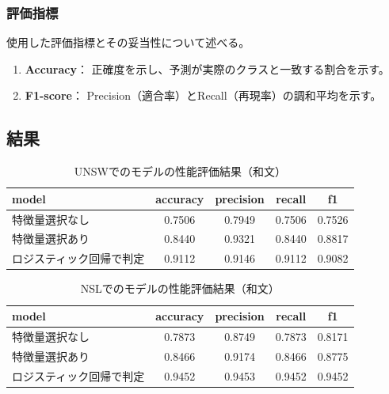 \documentclass{css}
\begin{document}
\subsubsection{評価指標}
使用した評価指標とその妥当性について述べる。
\begin{enumerate}
    \item \textbf{Accuracy}：
        正確度を示し、予測が実際のクラスと一致する割合を示す。
    \item \textbf{F1-score}：
        Precision（適合率）とRecall（再現率）の調和平均を示す。
\end{enumerate}

\subsection{結果}

\begin{table}[tb]
    \caption{UNSWでのモデルの性能評価結果（和文）}
    \centering
    \footnotesize
    \begin{tabular}{lcccc}
        \hline\hline
        model & accuracy & precision & recall & f1 \\
        \hline
        特徴量選択なし & 0.7506 & 0.7949 & 0.7506 & 0.7526 \\
        特徴量選択あり & 0.8440 & 0.9321 & 0.8440 & 0.8817 \\
        ロジスティック回帰で判定 & 0.9112 & 0.9146 & 0.9112 & 0.9082 \\
        \hline
    \end{tabular}
    \label{tab:model_performance}
\end{table}

\begin{table}[tb]
    \caption{NSLでのモデルの性能評価結果（和文）}
    \centering
    \footnotesize
    \begin{tabular}{lcccc}
        \hline\hline
        model & accuracy & precision & recall & f1 \\
        \hline
        特徴量選択なし & 0.7873 & 0.8749 & 0.7873 & 0.8171 \\
        特徴量選択あり & 0.8466 & 0.9174 & 0.8466 & 0.8775 \\
        ロジスティック回帰で判定 & 0.9452 & 0.9453 & 0.9452 & 0.9452 \\
        \hline
    \end{tabular}
    \label{tab:model_performance}
\end{table}
\end{document}
